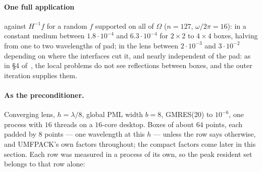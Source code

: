 \documentclass[11pt]{article}
\newcommand{\Om}{\Omega}
\begin{document}
\paragraph{One full application} against $H^{-1}f$ for a random $f$ supported on all of
$\Om$ ($n=127$, $\omega/2\pi=16$): in a constant medium between $1.8\cdot10^{-4}$ and
$6.3\cdot10^{-4}$ for $2\times2$ to $4\times4$ boxes, halving from one to two wavelengths
of pad; in the lens between $2\cdot10^{-3}$ and $3\cdot10^{-2}$ depending on where the
interfaces cut it, and nearly independent of the pad: as in \S4 of~\cite{Taus2020}, the local problems do not see
reflections between boxes, and the outer iteration supplies them.

\paragraph{As the preconditioner.} Converging lens, $h=\lambda/8$, global PML width
$b=8$, GMRES(20) to $10^{-6}$, one process with $16$ threads on a $16$-core desktop.
Boxes of about $64$ points, each padded by $8$ points --- one wavelength at this $h$ ---
unless the row says otherwise, and UMFPACK's own factors throughout; the compact factors
come later in this section. Each row was measured in a process of its own, so the peak
resident set belongs to that row alone:
\end{document}
